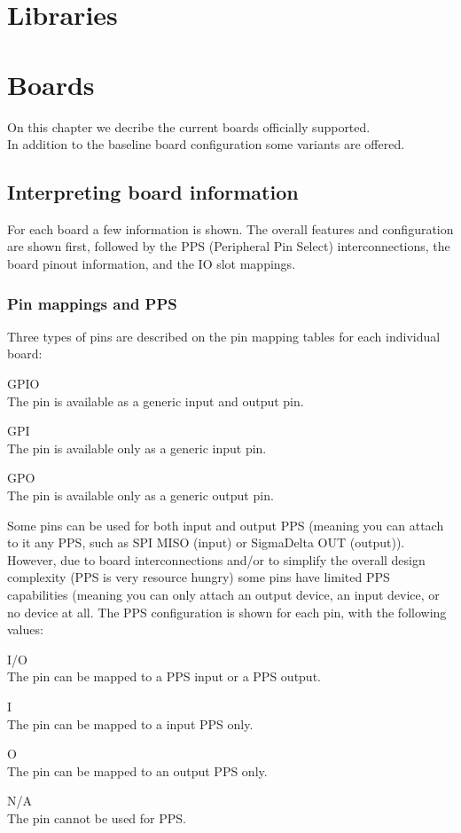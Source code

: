 \documentclass[12pt,a4paper,openany,smallheadings,headinclude,headsepline,final]{scrreprt}
\begin{document}









\chapter{Libraries}


\chapter{Boards}
On this chapter we decribe the current boards officially supported. \\
In addition to the baseline board configuration some variants are offered.
\section{Interpreting board information}
For each board a few information is shown. The overall features and configuration are shown first, followed by the PPS (Peripheral 
Pin Select) interconnections, the board pinout information, and the IO slot mappings.\\
\subsection{Pin mappings and PPS}
Three types of pins are described on the pin mapping tables for each individual board:
\begin{description}
\item{GPIO} \hfill \\ The pin is available as a generic input and output pin.
\item{GPI} \hfill \\ The pin is available only as a generic input pin.
\item{GPO} \hfill \\ The pin is available only as a generic output pin.
\end{description}
Some pins can be used for both input and output PPS (meaning you can attach to it any PPS, such as SPI MISO (input) or SigmaDelta OUT (output)).
However, due to board interconnections and/or to simplify the overall design complexity (PPS is very resource hungry) some pins
have limited PPS capabilities (meaning you can only attach an output device, an input device, or no
device at all. The PPS configuration is shown for each pin, with the following values:
\begin{description}
\item{I/O} \hfill \\ The pin can be mapped to a PPS input or a PPS output.
\item{I} \hfill \\ The pin can be mapped to a input PPS only.
\item{O} \hfill \\ The pin can be mapped to an output PPS only.
\item{N/A} \hfill \\ The pin cannot be used for PPS.
\end{description}






\end{document}
